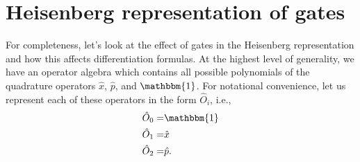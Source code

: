 \documentclass[aps,pra,10pt,twocolumn,groupedaddress,nofootinbib]{revtex4-1}
\theoremstyle{plain}
\newcommand{\ket}[1]{\ensuremath{\left| #1 \right \rangle}}
\newcommand{\bra}[1]{\ensuremath{\left \langle #1 \right |}}
\newcommand{\x}{\hat{x}}
\newcommand{\p}{\hat{p}}
\renewcommand{\c}{\hat{c}}
\renewcommand{\d}{\hat{d}}
\begin{document}
%


\section{Heisenberg representation of gates}
For completeness, let's look at the effect of gates in the Heisenberg representation and how this affects differentiation formulas.
At the highest level of generality, we have an operator algebra which contains all possible polynomials of the quadrature operators $\hat{x}$, $\hat{p}$, and $\mathbbm{1}$. For notational convenience, let us represent each of these operators in the form $\hat{O}_i$, i.e., 
\begin{align}
 \hat{O}_0 = & \mathbbm{1} \\
 \hat{O}_1 = & \hat{x} \\
 \hat{O}_2 = & \hat{p}.
\end{align}
\end{document}
